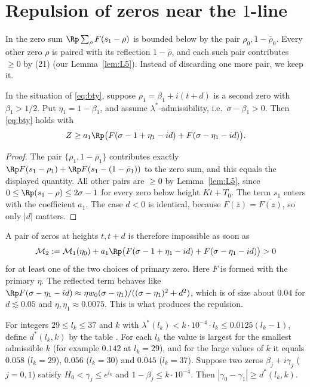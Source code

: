\section{Repulsion of zeros near the $1$-line}\label{sec:rep}

In \cite[Lemma~6]{BTY} the zero sum $\Rp\sum_\rho F(s_1-\rho)$ is bounded below by the pair $\rho_0, 1-\bar\rho_0$.
Every other zero $\rho$ is paired with its reflection $1-\bar\rho$, and each such pair contributes $\ge 0$ by (21) (our Lemma~\ref{lem:L5}).
Instead of discarding one more pair, we keep it.

\begin{lemma}\label{lem:twozero}
In the situation of \eqref{eq:bty}, suppose $\rho_1 = \beta_1 + i(t+d)$ is a second zero with $\beta_1 > 1/2$.
Put $\eta_1 = 1-\beta_1$, and assume $\lambda^*$-admissibility, i.e.\ $\sigma - \beta_1 > 0$. Then \eqref{eq:bty} holds with
\[
Z \ge a_1\Rp\big(F(\sigma - 1 + \eta_1 - id) + F(\sigma - \eta_1 - id)\big) .
\]
\end{lemma}

\begin{proof}
The pair $\{\rho_1, 1-\bar\rho_1\}$ contributes exactly $\Rp F(s_1 - \rho_1) + \Rp F(s_1 - (1-\bar\rho_1))$ to the zero sum, and this equals the displayed quantity.
All other pairs are $\ge 0$ by Lemma~\ref{lem:L5}, since $0 \le \Rp(s_1-\rho) \le 2\sigma - 1$ for every zero below height $Kt+T_0$.
The term $s_1$ enters with the coefficient $a_1$.
The case $d < 0$ is identical, because $F(\bar z) = \overline{F(z)}$, so only $|d|$ matters.
\end{proof}

A pair of zeros at heights $t, t+d$ is therefore impossible as soon as
\[
\mathcal M_2 := \mathcal M_1(\eta_0) + a_1\Rp\big(F(\sigma-1+\eta_1-id) + F(\sigma-\eta_1-id)\big) > 0
\]
for at least one of the two choices of primary zero.
Here $F$ is formed with the primary $\eta$.
The reflected term behaves like $\Rp F(\sigma - \eta_1 - id) \approx \eta w_0(\sigma-\eta_1)/((\sigma-\eta_1)^2 + d^2)$, which is of size about $0.04$ for $d \lesssim 0.05$ and $\eta, \eta_1 \approx 0.0075$.
This is what produces the repulsion.

\begin{theorem}\label{thm:rep}
For integers $29 \le l_k \le 37$ and $k$ with $\lambda^*(l_k) < k\cdot10^{-4}\cdot l_k \le 0.0125(l_k-1)$, define $d^*(l_k,k)$ by the table .
For each $l_k$ the value is largest for the smallest admissible $k$ (for example $0.142$ at $l_k = 29$), and for the large values of $k$ it equals $0.058$ ($l_k = 29$), $0.056$ ($l_k = 30$) and $0.045$ ($l_k = 37$).
Suppose two zeros $\beta_j + i\gamma_j$ ($j = 0,1$) satisfy $H_0 < \gamma_j \le e^{l_k}$ and $1-\beta_j \le k\cdot 10^{-4}$.
Then $|\gamma_0 - \gamma_1| \ge d^*(l_k, k)$.
\end{theorem}

